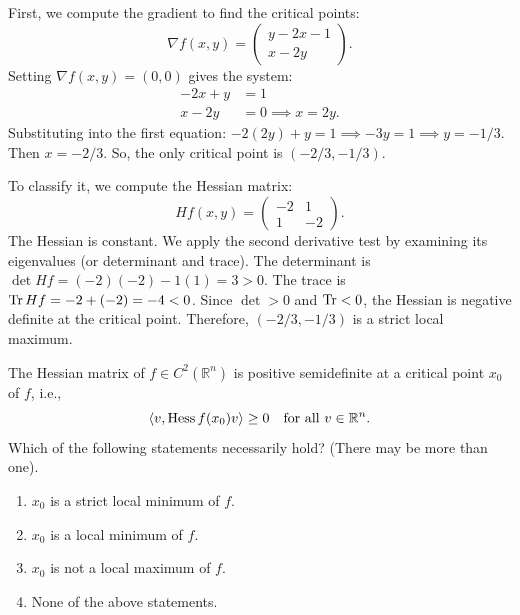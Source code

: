 \begin{exercisesolution}
First, we compute the gradient to find the critical points:
\[ \nabla f(x,y) = \begin{pmatrix} y - 2x - 1 \\ x - 2y \end{pmatrix}. \]
Setting $\nabla f(x,y) = (0,0)$ gives the system:
\begin{align*}
-2x + y &= 1 \\
x - 2y &= 0 \implies x = 2y.
\end{align*}
Substituting into the first equation: $-2(2y) + y = 1 \implies -3y = 1 \implies y = -1/3$.
Then $x = -2/3$. So, the only critical point is $(-2/3, -1/3)$.

To classify it, we compute the Hessian matrix:
\[ Hf(x,y) = \begin{pmatrix} -2 & 1 \\ 1 & -2 \end{pmatrix}. \]
The Hessian is constant. We apply the second derivative test by examining its eigenvalues (or determinant and trace).
The determinant is $\det Hf = (-2)(-2) - 1(1) = 3 > 0$. The trace is $\operatorname{Tr} Hf = -2 + (-2) = -4 < 0$.
Since $\det > 0$ and $\operatorname{Tr} < 0$, the Hessian is negative definite at the critical point.
Therefore, $(-2/3, -1/3)$ is a strict local maximum.
\end{exercisesolution}


\begin{exercise}
\label{ex:semidefinite_hessian_multiple_choice}
The Hessian matrix of $f \in C^2(\mathbb{R}^n)$ is positive semidefinite at a critical point $x_0$
of $f$, i.e.,
\[\langle v, \operatorname{Hess} f(x_0) v\rangle \geq 0 \quad \text{for all } v \in \mathbb{R}^n.\]
Which of the following statements necessarily hold? (There may be more than one).
\begin{enumerate}[label=\textbf{(\alph*)}]
  \item $x_0$ is a strict local minimum of $f$.
  \item $x_0$ is a local minimum of $f$.
  \item $x_0$ is not a local maximum of $f$.
  \item None of the above statements.
\end{enumerate}
\end{exercise}

